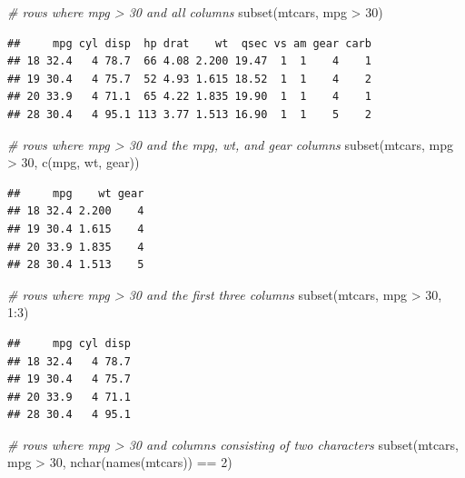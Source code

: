\documentclass[
]{book}
\newenvironment{Shaded}{\begin{snugshade}}{\end{snugshade}}
\newcommand{\CommentTok}[1]{\textcolor[rgb]{0.56,0.35,0.01}{\textit{#1}}}
\newcommand{\DecValTok}[1]{\textcolor[rgb]{0.00,0.00,0.81}{#1}}
\newcommand{\FunctionTok}[1]{\textcolor[rgb]{0.00,0.00,0.00}{#1}}
\newcommand{\NormalTok}[1]{#1}
\newcommand{\SpecialCharTok}[1]{\textcolor[rgb]{0.00,0.00,0.00}{#1}}
\begin{document}
\begin{Shaded}
\begin{Highlighting}[]
\CommentTok{\# rows where mpg \textgreater{} 30 and all columns}
\FunctionTok{subset}\NormalTok{(mtcars, mpg }\SpecialCharTok{\textgreater{}} \DecValTok{30}\NormalTok{)}
\end{Highlighting}
\end{Shaded}

\begin{verbatim}
##     mpg cyl disp  hp drat    wt  qsec vs am gear carb
## 18 32.4   4 78.7  66 4.08 2.200 19.47  1  1    4    1
## 19 30.4   4 75.7  52 4.93 1.615 18.52  1  1    4    2
## 20 33.9   4 71.1  65 4.22 1.835 19.90  1  1    4    1
## 28 30.4   4 95.1 113 3.77 1.513 16.90  1  1    5    2
\end{verbatim}

\begin{Shaded}
\begin{Highlighting}[]
\CommentTok{\# rows where mpg \textgreater{} 30 and the mpg, wt, and gear columns}
\FunctionTok{subset}\NormalTok{(mtcars, mpg }\SpecialCharTok{\textgreater{}} \DecValTok{30}\NormalTok{, }\FunctionTok{c}\NormalTok{(mpg, wt, gear))}
\end{Highlighting}
\end{Shaded}

\begin{verbatim}
##     mpg    wt gear
## 18 32.4 2.200    4
## 19 30.4 1.615    4
## 20 33.9 1.835    4
## 28 30.4 1.513    5
\end{verbatim}

\begin{Shaded}
\begin{Highlighting}[]
\CommentTok{\# rows where mpg \textgreater{} 30 and the first three columns}
\FunctionTok{subset}\NormalTok{(mtcars, mpg }\SpecialCharTok{\textgreater{}} \DecValTok{30}\NormalTok{, }\DecValTok{1}\SpecialCharTok{:}\DecValTok{3}\NormalTok{)}
\end{Highlighting}
\end{Shaded}

\begin{verbatim}
##     mpg cyl disp
## 18 32.4   4 78.7
## 19 30.4   4 75.7
## 20 33.9   4 71.1
## 28 30.4   4 95.1
\end{verbatim}

\begin{Shaded}
\begin{Highlighting}[]
\CommentTok{\# rows where mpg \textgreater{} 30 and columns consisting of two characters}
\FunctionTok{subset}\NormalTok{(mtcars, mpg }\SpecialCharTok{\textgreater{}} \DecValTok{30}\NormalTok{, }\FunctionTok{nchar}\NormalTok{(}\FunctionTok{names}\NormalTok{(mtcars)) }\SpecialCharTok{==} \DecValTok{2}\NormalTok{)}
\end{Highlighting}
\end{Shaded}
\end{document}
